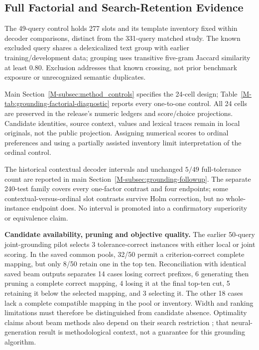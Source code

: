 \subsection{Full Factorial and Search-Retention Evidence}
\label{app:factorial-details}

The 49-query control holds 277 slots and its template inventory fixed within decoder comparisons, distinct from the 331-query matched study. The known excluded query shares a delexicalized text group with earlier training/development data; grouping uses transitive five-gram Jaccard similarity at least 0.80. Exclusion addresses that known crossing, not prior benchmark exposure or unrecognized semantic duplicates.

Main Section~\ref{M-subsec:method_controls} specifies the 24-cell design; Table~\ref{M-tab:grounding-factorial-diagnostic} reports every one-to-one control. All 24 cells are preserved in the release's numeric ledgers and score/choice projections. Candidate identities, source context, values and lexical traces remain in local originals, not the public projection. Assigning numerical scores to ordinal preferences and using a partially assisted inventory limit interpretation of the ordinal control.

The historical contextual decoder intervals and unchanged $5/49$ full-tolerance count are reported in main Section~\ref{M-subsec:grounding-followup}. The separate 240-test family covers every one-factor contrast and four endpoints; some contextual-versus-ordinal slot contrasts survive Holm correction, but no whole-instance endpoint does. No interval is promoted into a confirmatory superiority or equivalence claim.

\medskip\noindent\textbf{Candidate availability, pruning and objective quality.}
The earlier 50-query joint-grounding pilot selects 3 tolerance-correct
instances with either local or joint scoring. In the saved common pools,
32/50 permit a criterion-correct complete mapping, but only 8/50 retain one
in the top ten. Reconciliation with identical saved beam outputs separates
14 cases losing correct prefixes, 6 generating then pruning a complete
correct mapping, 4 losing it at the final top-ten cut, 5 retaining it below
the selected mapping, and 3 selecting it. The other 18 cases lack a complete
compatible mapping in the pool or inventory. Width and ranking limitations
must therefore be distinguished from candidate absence. Optimality claims
about beam methods also depend on their search restriction
\cite{huang2017beamfollowup}; that neural-generation result is methodological
context, not a guarantee for this grounding algorithm.

